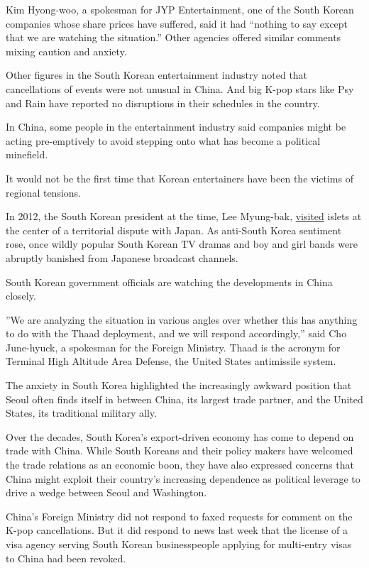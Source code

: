 Kim Hyong-woo, a spokesman for JYP Entertainment, one of the South
Korean companies whose share prices have suffered, said it had ``nothing
to say except that we are watching the situation.'' Other agencies
offered similar comments mixing caution and anxiety.

Other figures in the South Korean entertainment industry noted that
cancellations of events were not unusual in China. And big K-pop stars
like Psy and Rain have reported no disruptions in their schedules in the
country.

In China, some people in the entertainment industry said companies might
be acting pre-emptively to avoid stepping onto what has become a
political minefield.

It would not be the first time that Korean entertainers have been the
victims of regional tensions.

In 2012, the South Korean president at the time, Lee Myung-bak,
\href{http://www.nytimes3xbfgragh.onion/2012/08/11/world/asia/south-koreans-visit-to-disputed-islets-angers-japan.html}{visited}
islets at the center of a territorial dispute with Japan. As anti-South
Korea sentiment rose, once wildly popular South Korean TV dramas and boy
and girl bands were abruptly banished from Japanese broadcast channels.

South Korean government officials are watching the developments in China
closely.

''We are analyzing the situation in various angles over whether this has
anything to do with the Thaad deployment, and we will respond
accordingly,'' said Cho June-hyuck, a spokesman for the Foreign
Ministry. Thaad is the acronym for Terminal High Altitude Area Defense,
the United States antimissile system.

The anxiety in South Korea highlighted the increasingly awkward position
that Seoul often finds itself in between China, its largest trade
partner, and the United States, its traditional military ally.

Over the decades, South Korea's export-driven economy has come to depend
on trade with China. While South Koreans and their policy makers have
welcomed the trade relations as an economic boon, they have also
expressed concerns that China might exploit their country's increasing
dependence as political leverage to drive a wedge between Seoul and
Washington.

China's Foreign Ministry did not respond to faxed requests for comment
on the K-pop cancellations. But it did respond to news last week that
the license of a visa agency serving South Korean businesspeople
applying for multi-entry visas to China had been revoked.

